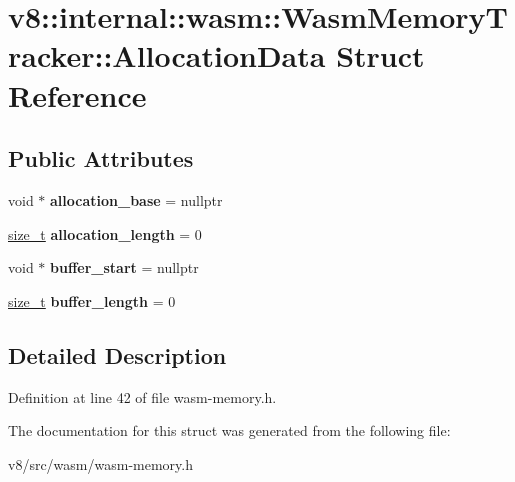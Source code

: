 \hypertarget{structv8_1_1internal_1_1wasm_1_1WasmMemoryTracker_1_1AllocationData}{}\section{v8\+:\+:internal\+:\+:wasm\+:\+:Wasm\+Memory\+Tracker\+:\+:Allocation\+Data Struct Reference}
\label{structv8_1_1internal_1_1wasm_1_1WasmMemoryTracker_1_1AllocationData}
\subsection*{Public Attributes}
\begin{DoxyCompactItemize}
\item 
\mbox{\label{structv8_1_1internal_1_1wasm_1_1WasmMemoryTracker_1_1AllocationData_af4bc619b48d539add2f3610d285bb729}} 
void $\ast$ {\bfseries allocation\+\_\+base} = nullptr
\item 
\mbox{\label{structv8_1_1internal_1_1wasm_1_1WasmMemoryTracker_1_1AllocationData_aa452ecc3e663358c8dfe769e55ec0689}} 
\mbox{\hyperlink{classsize__t}{size\+\_\+t}} {\bfseries allocation\+\_\+length} = 0
\item 
\mbox{\label{structv8_1_1internal_1_1wasm_1_1WasmMemoryTracker_1_1AllocationData_a1f4bab84579a4e8c682532927b8c81bf}} 
void $\ast$ {\bfseries buffer\+\_\+start} = nullptr
\item 
\mbox{\label{structv8_1_1internal_1_1wasm_1_1WasmMemoryTracker_1_1AllocationData_abe88d5a5a940374700054d4a985da8cb}} 
\mbox{\hyperlink{classsize__t}{size\+\_\+t}} {\bfseries buffer\+\_\+length} = 0
\end{DoxyCompactItemize}


\subsection{Detailed Description}


Definition at line 42 of file wasm-\/memory.\+h.



The documentation for this struct was generated from the following file\+:\begin{DoxyCompactItemize}
\item 
v8/src/wasm/wasm-\/memory.\+h\end{DoxyCompactItemize}
